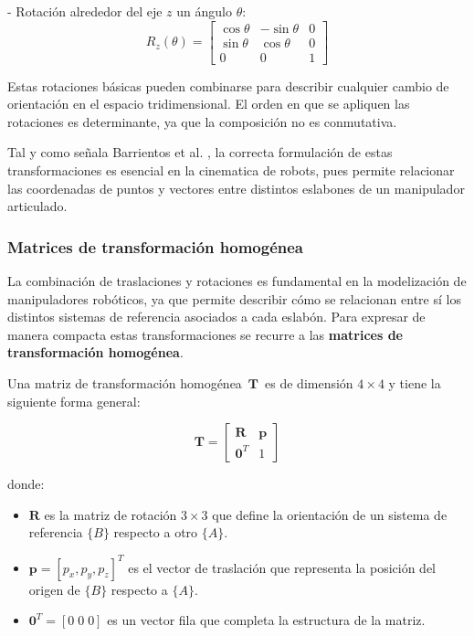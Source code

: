 \documentclass[12pt,a4paper,oneside]{report}
\begin{document}
- Rotación alrededor del eje $z$ un ángulo $\theta$:  
\begin{equation}
R_z(\theta) =
\begin{bmatrix}
\cos \theta & -\sin \theta & 0 \\
\sin \theta & \cos \theta & 0 \\
0 & 0 & 1
\end{bmatrix}
\label{eq:rotacion_matrizZ}
\end{equation}

Estas rotaciones básicas pueden combinarse para describir cualquier cambio de
orientación en el espacio tridimensional. El orden en que se apliquen las
rotaciones es determinante, ya que la composición no es conmutativa.  

Tal y como señala Barrientos et al. \cite{barrientos2014}, la correcta
formulación de estas transformaciones es esencial en la \gls{cinematica} de \glspl{robot},
pues permite relacionar las coordenadas de puntos y vectores entre distintos
eslabones de un manipulador articulado.


\subsubsection{Matrices de transformación homogénea}

La combinación de traslaciones y rotaciones es fundamental en la modelización
de manipuladores robóticos, ya que permite describir cómo se relacionan entre sí
los distintos sistemas de referencia asociados a cada eslabón. Para expresar
de manera compacta estas transformaciones se recurre a las
\textbf{matrices de transformación homogénea}.

Una matriz de transformación homogénea $\,\mathbf{T}\,$ es de dimensión
$4 \times 4$ y tiene la siguiente forma general:

\begin{equation}
\mathbf{T} =
\begin{bmatrix}
\mathbf{R} & \mathbf{p} \\
\mathbf{0}^T & 1
\end{bmatrix}
\label{eq:transformacion_homogenea}
\end{equation}

donde:
\begin{itemize}
    \item $\mathbf{R}$ es la matriz de rotación $3 \times 3$ que define la
    orientación de un sistema de referencia $\{B\}$ respecto a otro $\{A\}$.
    \item $\mathbf{p} = [p_x, p_y, p_z]^T$ es el vector de traslación que
    representa la posición del origen de $\{B\}$ respecto a $\{A\}$.
    \item $\mathbf{0}^T = [0 \; 0 \; 0]$ es un vector fila que completa la
    estructura de la matriz.
\end{itemize}
\end{document}
